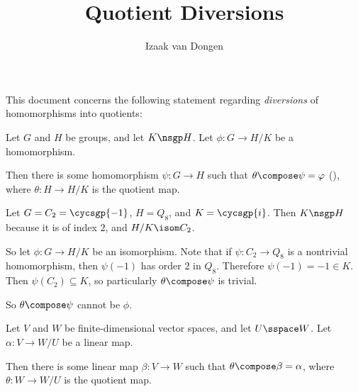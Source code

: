 \documentclass[a4paper,12pt]{article}
\author{Izaak van Dongen}
\title{Quotient Diversions}
\begin{document}
\maketitle

This document concerns the following statement regarding \emph{diversions} of
homomorphisms into quotients:
\begin{tcolorbox}
 Let \(G\) and \(H\) be groups, and let \(K \nsgp H\). Let
 \(\phi: G \to H/K\) be a homomorphism.

 Then there is some homomorphism \(\psi: G \to H\) such that
 \(\theta \compose \psi = \phi\) (),
 where \(\theta: H \to H/K\) is the quotient map.
\end{tcolorbox}
Let \(G = C_2 = \cycsgp{-1}\), \(H = Q_8\), and \(K = \cycsgp{i}\).
Then \(K \nsgp H\) because it is of index \(2\), and \(H/K \isom C_2\).

So let \(\phi: G \to H/K\) be an isomorphism.
Note that if \(\psi: C_2 \to Q_8\) is a nontrivial homomorphism, then
\(\psi(-1)\) has order \(2\) in \(Q_8\). Therefore \(\psi(-1) = -1 \in K\). Then
\(\psi(C_2) \subseteq K\), so particularly \(\theta \compose \psi\) is trivial.

So \(\theta \compose \psi\) cannot be \(\phi\).

\begin{tcolorbox}
 Let \(V\) and \(W\) be finite-dimensional vector spaces, and let
 \(U \sspace W\). Let \(\alpha: V \to W/U\) be a linear map.

 Then there is some linear map \(\beta: V \to W\) such that
 \(\theta \compose \beta = \alpha\), where \(\theta: W \to W/U\) is the quotient
 map.
\end{tcolorbox}
\end{document}
